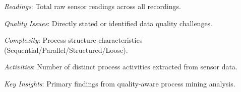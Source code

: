 \begin{table}[t]
{\begin{tabular}{@{}l|lcccc|cccl@{}}
\bottomrule
\end{tabular}%
}
\vspace{-2mm}
\begin{tablenotes}[flushleft]
\footnotesize
\item \textit{Readings}: Total raw sensor readings across all recordings.
\item \textit{Quality Issues}: Directly stated or identified data quality challenges.
\item \textit{Complexity}: Process structure characteristics (Sequential/Parallel/Structured/Loose).
\item \textit{Activities}: Number of distinct process activities extracted from sensor data.
\item \textit{Key Insights}: Primary findings from quality-aware process mining analysis.
\end{tablenotes}
\end{table}
